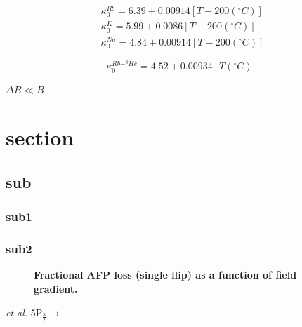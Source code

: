 \documentclass[pdftex,letterpaper,12pt]{report}
\begin{document}
	
\begin{subequations}
	\begin{gather}
	\kappa_{0}^{Rb}=6.39+0.00914[T-200(^{\circ}C)]\\
	\kappa_{0}^{K}=5.99+0.0086[T-200(^{\circ}C)]\\
	\kappa_{0}^{Na}=4.84+0.00914[T-200(^{\circ}C)]
	\end{gather}
\end{subequations}

\begin{equation}
\kappa_{0}^{Rb-^{3}He}=4.52+0.00934[T(^{\circ}C)]
\end{equation}

$\Delta B \ll B$

\section{section}
\subsection{sub}
\subsubsection{sub1}
\subsubsection{sub2}

\begin{figure}[H]
	\centering
	\caption{{\bf Fractional AFP loss (single flip) as a function of field gradient.}}
	\label{AFPLossvsGradient}
\end{figure}

\emph{et al.}
5P$_{\frac{3}{2}}\rightarrow$


\end{document}
